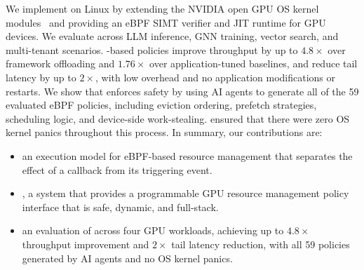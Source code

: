 

We implement \sys{} on Linux by extending the NVIDIA open GPU OS kernel modules~\cite{nvidia-open-gpu} and providing an eBPF SIMT verifier and JIT runtime for GPU devices.
We evaluate \sys{} across LLM inference, GNN training, vector search, and multi-tenant scenarios.
\sys-based policies improve throughput by up to $4.8\times$ over framework offloading and $1.76\times$ over application-tuned baselines, and reduce tail latency by up to $2\times$, with low overhead and no application modifications or restarts.
We show that \sys{} enforces safety by using AI agents to generate all of the 59 evaluated eBPF policies, including eviction ordering, prefetch strategies, scheduling logic, and device-side work-stealing.
\sys{} ensured that there were zero OS kernel panics throughout this process.
In summary, our contributions are:

\begin{itemize}[leftmargin=*,itemsep=0pt]
  \item an execution model for eBPF-based resource management that separates the effect of a callback from its triggering event.
  \item \sys, a system that provides a programmable GPU resource management policy interface that is safe, dynamic, and full-stack.
  \item an evaluation of \sys across four GPU workloads, achieving up to $4.8\times$ throughput improvement and $2\times$ tail latency reduction, with all 59 policies generated by AI agents and no OS kernel panics.
\end{itemize}
